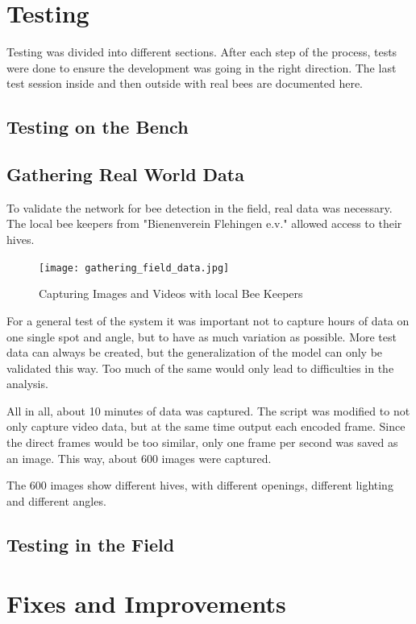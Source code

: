 \documentclass[a4paper,titlepage]{article}
\begin{document}
\newpage
\section{Testing}

Testing was divided into different sections.
After each step of the process, tests were done to ensure the development was going in the right direction.
The last test session inside and then outside with real bees are documented here.

\subsection{Testing on the Bench}
\subsection{Gathering Real World Data}

To validate the network for bee detection in the field, real data was necessary.
The local bee keepers from "Bienenverein Flehingen e.v." allowed access to their hives.

\begin{figure}[H]
    \texttt{[image: gathering\_field\_data.jpg]}
    \caption{Capturing Images and Videos with local Bee Keepers}
\end{figure}

For a general test of the system it was important not to capture hours of data on one single spot and angle, but to have as much variation as possible.
More test data can always be created, but the generalization of the model can only be validated this way.
Too much of the same would only lead to difficulties in the analysis.

All in all, about 10 minutes of data was captured.
The script was modified to not only capture video data, but at the same time output each encoded frame.
Since the direct frames would be too similar, only one frame per second was saved as an image.
This way, about 600 images were captured.

The 600 images show different hives, with different openings, different lighting and different angles.

\subsection{Testing in the Field}

\newpage
\section{Fixes and Improvements}
\end{document}
